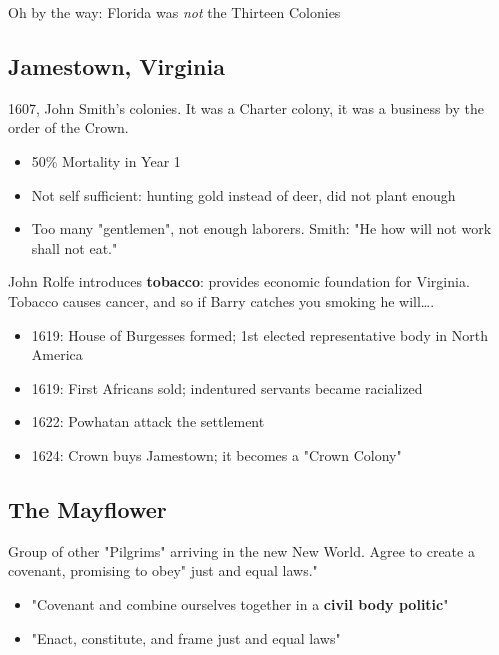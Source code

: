 \documentclass[letterpaper]{article}
\begin{document}
Oh by the way: Florida was \emph{not} the Thirteen Colonies


\subsection{Jamestown, Virginia}
\label{sec:org14704ec}
1607, John Smith's colonies. It was a Charter colony, it was a business by the order of the Crown.

\begin{itemize}
\item 50\% Mortality in Year 1
\item Not self sufficient: hunting gold instead of deer, did not plant enough
\item Too many "gentlemen", not enough laborers. Smith: "He how will not work shall not eat."
\end{itemize}

John Rolfe introduces \textbf{tobacco}: provides economic foundation for Virginia. Tobacco causes cancer, and so if Barry catches you smoking he will\ldots{}.

\begin{itemize}
\item 1619: House of Burgesses formed; 1st elected representative body in North America
\item 1619: First Africans sold; indentured servants became racialized
\item 1622: Powhatan attack the settlement
\item 1624: Crown buys Jamestown; it becomes a "Crown Colony"
\end{itemize}

\subsection{The Mayflower}
\label{sec:org543b23b}
Group of other "Pilgrims" arriving in the new New World. Agree to create a covenant, promising to obey" just and equal laws."

\begin{itemize}
\item "Covenant and combine ourselves together in a \textbf{\textbf{civil body politic}}"
\item "Enact, constitute, and frame just and equal laws"
\end{itemize}
\end{document}
